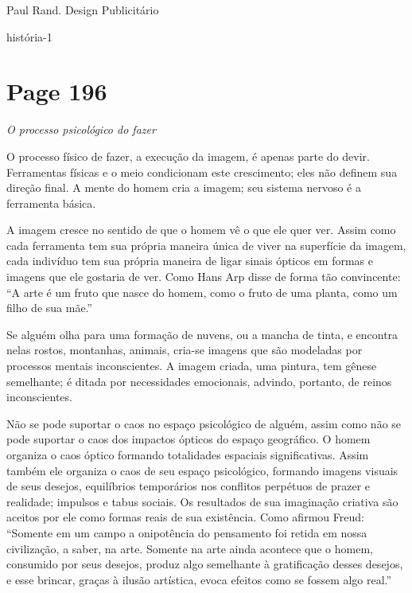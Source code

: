 \documentclass[a4paper]{article}
\begin{document}
Paul Rand. Design Publicitário

história-1

\newpage
\section*{Page 196}

{\centering\itshape O processo psicológico do fazer\par}
\vspace{\baselineskip} %

O processo físico de fazer, a execução da imagem, é apenas parte do devir. Ferramentas físicas e o meio condicionam este crescimento; eles não definem sua direção final. A mente do homem cria a imagem; seu sistema nervoso é a ferramenta básica.

A imagem cresce no sentido de que o homem vê o que ele quer ver. Assim como cada ferramenta tem sua própria maneira única de viver na superfície da imagem, cada indivíduo tem sua própria maneira de ligar sinais ópticos em formas e imagens que ele gostaria de ver. Como Hans Arp disse de forma tão convincente: ``A arte é um fruto que nasce do homem, como o fruto de uma planta, como um filho de sua mãe.''

Se alguém olha para uma formação de nuvens, ou a mancha de tinta, e encontra nelas rostos, montanhas, animais, cria-se imagens que são modeladas por processos mentais inconscientes. A imagem criada, uma pintura, tem gênese semelhante; é ditada por necessidades emocionais, advindo, portanto, de reinos inconscientes.

Não se pode suportar o caos no espaço psicológico de alguém, assim como não se pode suportar o caos dos impactos ópticos do espaço geográfico. O homem organiza o caos óptico formando totalidades espaciais significativas. Assim também ele organiza o caos de seu espaço psicológico, formando imagens visuais de seus desejos, equilíbrios temporários nos conflitos perpétuos de prazer e realidade; impulsos e tabus sociais. Os resultados de sua imaginação criativa são aceitos por ele como formas reais de sua existência. Como afirmou Freud: ``Somente em um campo a onipotência do pensamento foi retida em nossa civilização, a saber, na arte. Somente na arte ainda acontece que o homem, consumido por seus desejos, produz algo semelhante à gratificação desses desejos, e esse brincar, graças à ilusão artística, evoca efeitos como se fossem algo real.''
\end{document}
